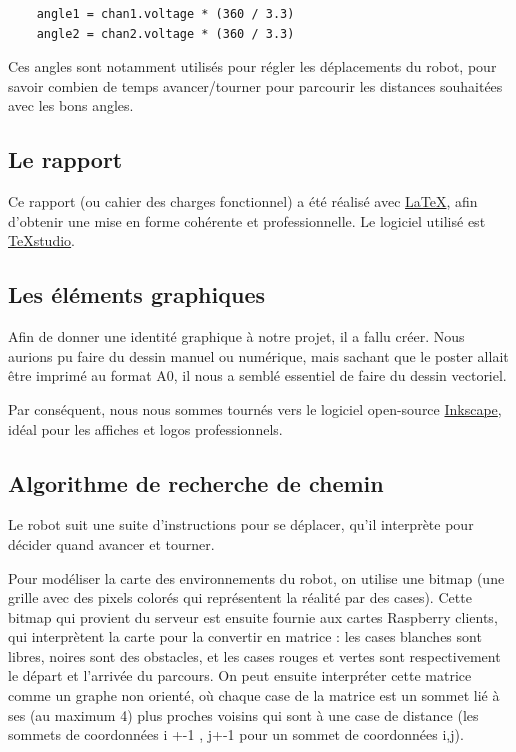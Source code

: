 \documentclass[a4paper,12pt]{report}  %
\begin{document}
\begin{lstlisting}
	angle1 = chan1.voltage * (360 / 3.3)
	angle2 = chan2.voltage * (360 / 3.3)
\end{lstlisting}

Ces angles sont notamment utilisés pour régler les déplacements du robot, pour savoir combien de temps avancer/tourner pour parcourir les distances souhaitées avec les bons angles.

\subsection{Le rapport}

Ce rapport (ou cahier des charges fonctionnel) a été réalisé avec \href{https://www.latex-project.org/}{\LaTeX}, afin d'obtenir une mise en forme cohérente et professionnelle. Le logiciel utilisé est \href{https://flathub.org/apps/org.texstudio.TeXstudio}{TeXstudio}. 

\subsection{Les éléments graphiques}

Afin de donner une identité graphique à notre projet, il a fallu créer. Nous aurions pu faire du dessin manuel ou numérique, mais sachant que le poster allait être imprimé au format A0, il nous a semblé essentiel de faire du dessin vectoriel. 

Par conséquent, nous nous sommes tournés vers le logiciel open-source \href{https://inkscape.org/fr/}{Inkscape}, idéal pour les affiches et logos professionnels. 

\subsection{Algorithme de recherche de chemin}
Le robot suit une suite d’instructions pour se déplacer, qu’il interprète pour décider quand avancer et tourner.

Pour modéliser la carte des environnements du robot, on utilise une bitmap (une grille avec des pixels colorés qui représentent la réalité par des cases). Cette bitmap qui provient du serveur est ensuite fournie aux cartes Raspberry clients, qui interprètent la carte pour la convertir en matrice : les cases blanches sont libres, noires sont des obstacles, et les cases rouges et vertes sont respectivement le départ et l’arrivée du parcours. On peut ensuite interpréter cette matrice comme un graphe non orienté, où chaque case de la matrice est un sommet lié à ses (au maximum 4) plus proches voisins qui sont à une case de distance (les sommets de coordonnées i +-1 , j+-1 pour un sommet de coordonnées i,j).
\end{document}
